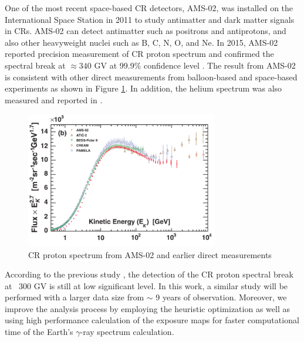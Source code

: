 One of the most recent space-based CR detectors, AMS-02, was installed
on the International Space Station in 2011 to study antimatter and
dark matter signals in CRs. 
AMS-02 can detect antimatter such as
positrons and antiprotons, and also
other heavyweight nuclei such as B, C, N, O, and Ne.
In 2015,
AMS-02 reported precision measurement of CR proton spectrum and
confirmed the spectral break at $\approx340$ GV at 99.9\%
confidence level \citep{AMS02pr2015}. 
The result from AMS-02 is consistent with other direct 
measurements from balloon-based and space-based experiments
as shown in Figure \ref{fig:ams02proton}.
In addition, the helium spectrum
was also measured and reported in \cite{Heliumflux2015}. 


\begin{figure}[h!]
    \centering
    \includegraphics[width=0.75\textwidth]{content/literature_review/figures/direct_proton_measurement.png}
    \caption{
        CR proton spectrum from AMS-02 and earlier direct measurements
        \citep{AMS02pr2015}
    }
    \label{fig:ams02proton}
\end{figure}

According to the previous study \citep{FermiEarth14}, 
the detection of the CR proton spectral break at ~300 GV
is still at low significant level.
In this work, a similar study will be performed with 
a larger data size from $\sim$ 9 years of observation.
Moreover, we improve the analysis
process by employing the heuristic optimization as well as using
high performance calculation of the exposure maps for faster
computational time of the Earth's $\gamma$-ray spectrum calculation. 